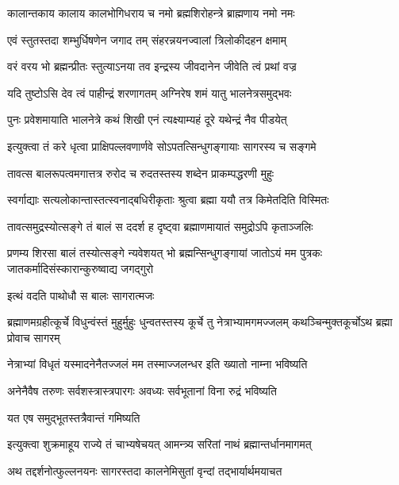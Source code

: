 \twolineshloka
{कालान्तकाय कालाय कालभोगिधराय च}
{नमो ब्रह्मशिरोहन्त्रे ब्राह्मणाय नमो नमः} %


\twolineshloka
{एवं स्तुतस्तदा शम्भुर्धिषणेन जगाद तम्}
{संहरन्नयनज्वालां त्रिलोकीदहन क्षमाम्} %

\twolineshloka
{वरं वरय भो ब्रह्मन्प्रीतः स्तुत्याऽनया तव}
{इन्द्रस्य जीवदानेन जीवेति त्वं प्रथां वज्र} %


\twolineshloka
{यदि तुष्टोऽसि देव त्वं पाहीन्द्रं शरणागतम्}
{अग्निरेष शमं यातु भालनेत्रसमुद्भवः} %


\twolineshloka
{पुनः प्रवेशमायाति भालनेत्रे कथं शिखी}
{एनं त्यक्ष्याम्यहं दूरे यथेन्द्रं नैव पीडयेत्} %


\twolineshloka
{इत्युक्त्वा तं करे धृत्वा प्राक्षिपल्लवणार्णवे}
{सोऽपतत्सिन्धुगङ्गायाः सागरस्य च सङ्गमे} %

\twolineshloka
{तावत्स बालरूपत्वमगात्तत्र रुरोद च}
{रुदतस्तस्य शब्देन प्राकम्पद्धरणी मुहुः} %

\twolineshloka
{स्वर्गाद्याः सत्यलोकान्तास्तत्स्वनाद्बधिरीकृताः}
{श्रुत्वा ब्रह्मा ययौ तत्र किमेतदिति विस्मितः} %

\twolineshloka
{तावत्समुद्रस्योत्सङ्गे तं बालं स ददर्श ह}
{दृष्ट्वा ब्रह्माणमायातं समुद्रोऽपि कृताञ्जलिः} %

\threelineshloka
{प्रणम्य शिरसा बालं तस्योत्सङ्गे न्यवेशयत्}
{भो ब्रह्मन्सिन्धुगङ्गायां जातोऽयं मम पुत्रकः}
{जातकर्मादिसंस्कारान्कुरुष्वाद्य जगद्गुरो} %



\onelineshloka
{इत्थं वदति पाथोधौ स बालः सागरात्मजः} %

\threelineshloka
{ब्रह्माणमग्रहीत्कूर्चे विधुन्वंस्तं मुहुर्मुहुः}
{धुन्वतस्तस्य कूर्चे तु नेत्राभ्यामगमज्जलम्}
{कथञ्चिन्मुक्तकूर्चोऽथ ब्रह्मा प्रोवाच सागरम्} %


\twolineshloka
{नेत्राभ्यां विधृतं यस्मादनेनैतज्जलं मम}
{तस्माज्जलन्धर इति ख्यातो नाम्ना भविष्यति} %

\twolineshloka
{अनेनैवैष तरुणः सर्वशस्त्रास्त्रपारगः}
{अवध्यः सर्वभूतानां विना रुद्रं भविष्यति} %


\onelineshloka
{यत एष समुद्भूतस्तत्रैवान्तं गमिष्यति} %


\twolineshloka
{इत्युक्त्वा शुक्रमाहूय राज्ये तं चाभ्यषेचयत्}
{आमन्त्र्य सरितां नाथं ब्रह्मान्तर्धानमागमत्} %

\twolineshloka
{अथ तद्दर्शनोत्फुल्लनयनः सागरस्तदा}
{कालनेमिसुतां वृन्दां तद्भार्यार्थमयाचत} %

